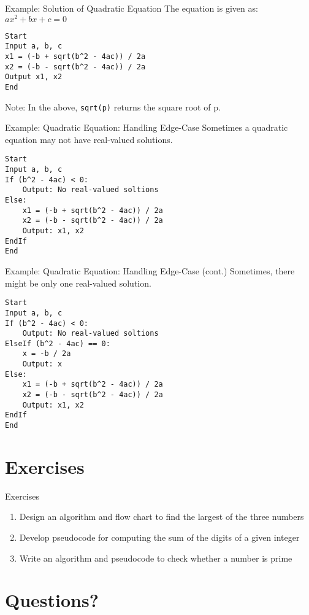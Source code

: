 \documentclass[12pt, aspectratio=169]{beamer}
\begin{document}
    \begin{frame}[fragile]{Example: Solution of Quadratic Equation}
        The equation is given as: $ax^2 + bx + c = 0$
        \begin{verbatim}
Start
Input a, b, c
x1 = (-b + sqrt(b^2 - 4ac)) / 2a
x2 = (-b - sqrt(b^2 - 4ac)) / 2a
Output x1, x2
End
        \end{verbatim}

        Note: In the above, \verb|sqrt(p)| returns the square root of p.
    \end{frame}


    \begin{frame}[fragile]{Example: Quadratic Equation: Handling Edge-Case}
        Sometimes a quadratic equation may not have real-valued solutions.
        \begin{verbatim}
Start
Input a, b, c
If (b^2 - 4ac) < 0:
    Output: No real-valued soltions
Else:
    x1 = (-b + sqrt(b^2 - 4ac)) / 2a
    x2 = (-b - sqrt(b^2 - 4ac)) / 2a
    Output: x1, x2
EndIf
End
        \end{verbatim}
    \end{frame}


    \begin{frame}[fragile]{Example: Quadratic Equation: Handling Edge-Case (cont.)}
        Sometimes, there might be only one real-valued solution.
        \begin{verbatim}
Start
Input a, b, c
If (b^2 - 4ac) < 0:
    Output: No real-valued soltions
ElseIf (b^2 - 4ac) == 0:
    x = -b / 2a
    Output: x
Else:
    x1 = (-b + sqrt(b^2 - 4ac)) / 2a
    x2 = (-b - sqrt(b^2 - 4ac)) / 2a
    Output: x1, x2
EndIf
End
        \end{verbatim}
    \end{frame}


    \section{Exercises}

    \begin{frame}{Exercises}
    \begin{enumerate}
        \item Design an algorithm and flow chart to find the largest of the three numbers
        \item Develop pseudocode for computing the sum of the digits of a given integer
        \item Write an algorithm and pseudocode to check whether a number is prime
    \end{enumerate}
    \end{frame}

    \section*{Questions?}
\end{document}
